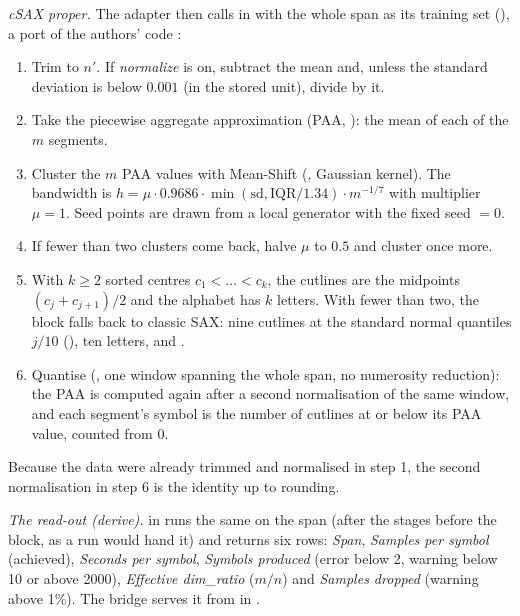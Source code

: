 \emph{cSAX proper.} The adapter then calls  in
 with the whole span as its training set
(), a port of the authors' code
\citep{bountrogiannis2022distribution}:
\begin{enumerate}
\item Trim to $n'$. If \emph{normalize} is on, subtract the mean and, unless the standard
  deviation is below $0.001$ (in the stored unit), divide by it.
\item Take the piecewise aggregate approximation (PAA, ): the mean of each of
  the $m$ segments.
\item Cluster the $m$ PAA values with Mean-Shift (, Gaussian
  kernel). The bandwidth is
  $h = \mu\cdot 0.9686\cdot \min(\mathrm{sd}, \mathrm{IQR}/1.34)\cdot m^{-1/7}$ with
  multiplier $\mu = 1$. Seed points are drawn from a local generator with the fixed seed
   $=0$.
\item If fewer than two clusters come back, halve $\mu$ to $0.5$ and cluster once more.
\item With $k \geq 2$ sorted centres $c_1<\dots<c_k$, the cutlines are the midpoints
  $(c_j + c_{j+1})/2$ and the alphabet has $k$ letters. With fewer than two, the block
  falls back to classic SAX: nine cutlines at the standard normal quantiles $j/10$
  (), ten letters, and .
\item Quantise (, one window spanning the whole span, no numerosity
  reduction): the PAA is computed again after a second normalisation of the same window, and
  each segment's symbol is the number of cutlines at or below its PAA value, counted from 0.
\end{enumerate}
Because the data were already trimmed and normalised in step 1, the second normalisation in
step 6 is the identity up to rounding.

\emph{The read-out (derive).}  in  runs
the same  on the span (after the stages before the block, as a run would
hand it) and returns six rows: \emph{Span}, \emph{Samples per symbol} (achieved),
\emph{Seconds per symbol}, \emph{Symbols produced} (error below 2, warning below 10 or above
2000), \emph{Effective dim\_ratio} ($m/n$) and \emph{Samples dropped} (warning above 1\%).
The bridge serves it from  in .

